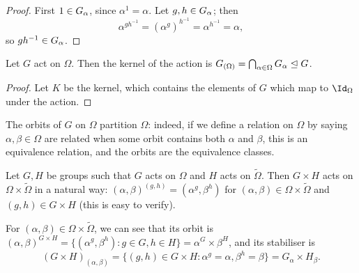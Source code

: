 \begin{proof}
     First $1 \in \added{2}{G_\alpha}$, since $\alpha^1 = \alpha$. Let $g,h \in \added{2}{G_\alpha}$; then
    $$\alpha^{gh^{-1}} = (\alpha^g)^{h^{-1}} = \alpha^{h^{-1}} = \alpha,$$
    so $gh^{-1} \in \added{2}{G_\alpha}$. 
\end{proof}


\begin{proposition}\label{prop:kernel_action_stabiliser}
    Let $G$ act on $\Omega$. Then the kernel of the action is $\added{2}{G_{(\Omega)}} = \bigcap_{\alpha \in \Omega} \added{2}{G_\alpha} \trianglelefteq G$.
\end{proposition}

\begin{proof}
    Let $K$ be the kernel, which contains the elements of $G$ which map to $\Id_\Omega$ under the action. 
\end{proof}

The orbits of $G$ on $\Omega$ partition $\Omega$: indeed, if we define a relation on $\Omega$ by saying $\alpha,\beta \in \Omega$ are related when some orbit contains both $\alpha$ and $\beta$, this is an equivalence relation, and the orbits are the equivalence classes.

\begin{example}\label{eg:direct_product_action}
    Let $G,H$ be groups such that $G$ acts on $\Omega$ and $H$ acts on $\tilde\Omega$. Then $G \times H$ acts on $\Omega \times \tilde\Omega$ in a natural way: $(\alpha,\beta)^{(g,h)} = (\alpha^g,\beta^h)$ for $(\alpha,\beta) \in \Omega \times \tilde\Omega$ and $(g,h) \in G \times H$ (this is easy to verify).

    For $(\alpha,\beta) \in \Omega \times \tilde\Omega$, we can see that its orbit is $(\alpha,\beta)^{G \times H} = \{(\alpha^g,\beta^h) : g \in G,h \in H\} = \alpha^G \times \beta^H$, and its stabiliser is
    $$(G \times H)_{(\alpha,\beta)} = \{(g,h) \in G \times H : \alpha^g = \alpha,\beta^h = \beta\} = G_\alpha \times H_\beta.$$
\end{example}

